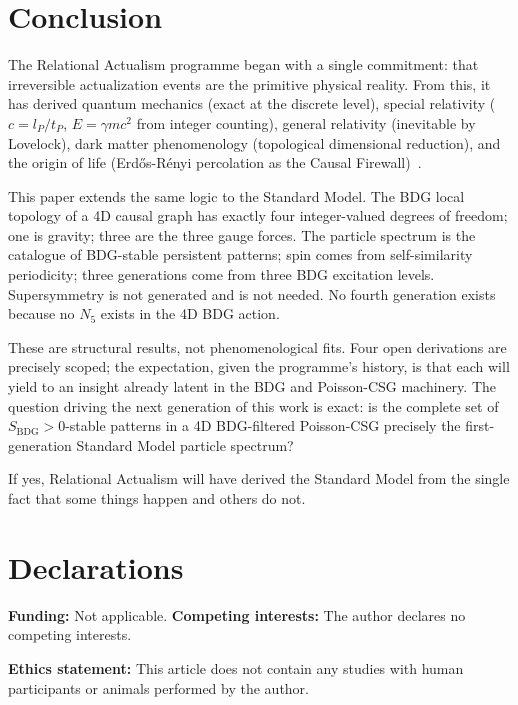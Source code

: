 \documentclass[11pt,a4paper]{article}
\newcommand{\SBDG}{S_{\mathrm{BDG}}}
\begin{document}
\section{Conclusion}
\label{sec:conclusion}

The Relational Actualism programme began with a single commitment: that
irreversible actualization events are the primitive physical reality. From this,
it has derived quantum mechanics (exact at the discrete level), special
relativity ($c = l_P/t_P$, $E = \gamma mc^2$ from integer counting), general
relativity (inevitable by Lovelock), dark matter phenomenology (topological
dimensional reduction), and the origin of life (Erd\H{o}s-R\'{e}nyi percolation as the Causal Firewall)~\citep{ErdosRenyi1960}.

This paper extends the same logic to the Standard Model. The BDG local
topology of a 4D causal graph has exactly four integer-valued degrees of
freedom; one is gravity; three are the three gauge forces. The particle
spectrum is the catalogue of BDG-stable persistent patterns; spin comes from
self-similarity periodicity; three generations come from three BDG excitation
levels. Supersymmetry is not generated and is not needed. No fourth generation
exists because no $N_5$ exists in the 4D BDG action.

These are structural results, not phenomenological fits. Four open derivations
are precisely scoped; the expectation, given the programme's history, is that
each will yield to an insight already latent in the BDG and Poisson-CSG
machinery. The question driving the next generation of this work is exact:
is the complete set of $\SBDG > 0$-stable patterns in a 4D BDG-filtered
Poisson-CSG precisely the first-generation Standard Model particle spectrum?

If yes, Relational Actualism will have derived the Standard Model from the
single fact that some things happen and others do not.


\section*{Declarations}
\textbf{Funding:} Not applicable.\quad
\textbf{Competing interests:} The author declares no competing interests.

\textbf{Ethics statement:} This article does not contain any studies with human participants or animals performed by the author.
\end{document}
